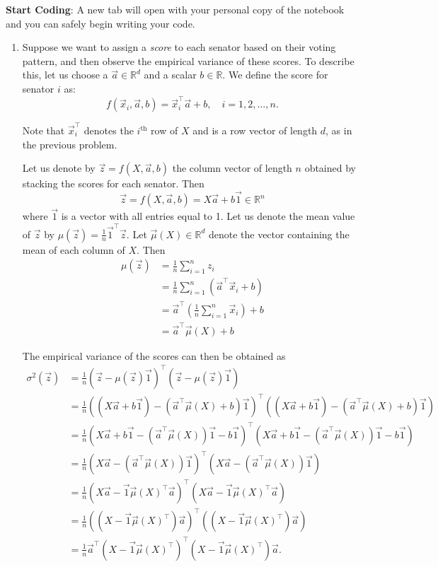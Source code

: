 \documentclass[10pt]{article}
\theoremstyle{definition}
\theoremstyle{plain}
\newcommand{\RR}{\mathbb{R}}
\begin{document}
\textbf{Start Coding}: A new tab will open with your personal copy of the notebook and you can safely begin writing your code.

\begin{enumerate}[label=(\alph*)]
\item Suppose we want to assign a \emph{score} to each senator based on their voting pattern, and then observe the empirical variance of these scores. To describe this, let us choose a $\vec{a} \in \RR^d$ and a scalar $b \in \RR$. We define the score for senator $i$ as:
\begin{equation}
f(\vec{x}_i, \vec{a}, b) = \vec{x}_i^\top \vec{a} + b, \quad i = 1, 2, \ldots, n.
\end{equation}

Note that $\vec{x}_i^\top$ denotes the $i^{\text{th}}$ row of $X$ and is a row vector of length $d$, as in the previous problem.

Let us denote by $\vec{z} = f(X, \vec{a}, b)$ the column vector of length $n$ obtained by stacking the scores for each senator. Then
\begin{equation}
\vec{z} = f(X, \vec{a}, b) = X\vec{a} + b\vec{1} \in \RR^n
\end{equation}
where $\vec{1}$ is a vector with all entries equal to 1. Let us denote the mean value of $\vec{z}$ by $\mu(\vec{z}) = \frac{1}{n}\vec{1}^\top \vec{z}$. Let $\vec{\mu}(X) \in \RR^d$ denote the vector containing the mean of each column of $X$. Then
\begin{align}
\mu(\vec{z}) &= \frac{1}{n}\sum_{i=1}^n z_i \\
&= \frac{1}{n}\sum_{i=1}^n \left(\vec{a}^\top \vec{x}_i + b\right) \\
&= \vec{a}^\top \left(\frac{1}{n}\sum_{i=1}^n \vec{x}_i\right) + b \\
&= \vec{a}^\top \vec{\mu}(X) + b
\end{align}

The empirical variance of the scores can then be obtained as
\begin{align}
\sigma^2(\vec{z}) &= \frac{1}{n}(\vec{z} - \mu(\vec{z})\vec{1})^\top(\vec{z} - \mu(\vec{z})\vec{1}) \\
&= \frac{1}{n}((X\vec{a} + b\vec{1}) - (\vec{a}^\top \vec{\mu}(X) + b)\vec{1})^\top((X\vec{a} + b\vec{1}) - (\vec{a}^\top \vec{\mu}(X) + b)\vec{1}) \\
&= \frac{1}{n}(X\vec{a} + b\vec{1} - (\vec{a}^\top \vec{\mu}(X))\vec{1} - b\vec{1})^\top(X\vec{a} + b\vec{1} - (\vec{a}^\top \vec{\mu}(X))\vec{1} - b\vec{1}) \\
&= \frac{1}{n}(X\vec{a} - (\vec{a}^\top \vec{\mu}(X))\vec{1})^\top(X\vec{a} - (\vec{a}^\top \vec{\mu}(X))\vec{1}) \\
&= \frac{1}{n}(X\vec{a} - \vec{1}\vec{\mu}(X)^\top \vec{a})^\top(X\vec{a} - \vec{1}\vec{\mu}(X)^\top \vec{a}) \\
&= \frac{1}{n}((X - \vec{1}\vec{\mu}(X)^\top)\vec{a})^\top((X - \vec{1}\vec{\mu}(X)^\top)\vec{a}) \\
&= \frac{1}{n}\vec{a}^\top (X - \vec{1}\vec{\mu}(X)^\top)^\top(X - \vec{1}\vec{\mu}(X)^\top)\vec{a}.
\end{align}


\end{enumerate}
\end{document}
